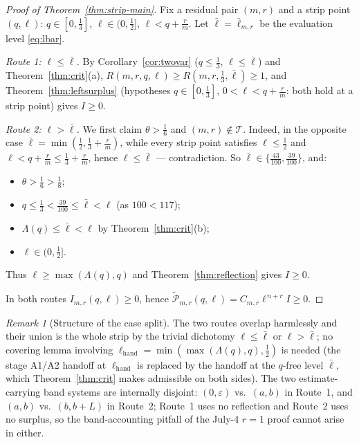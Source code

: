 \documentclass[11pt]{article}
\theoremstyle{remark}
\newtheorem{remark}[theorem]{Remark}
\theoremstyle{plain}
\theoremstyle{plain}
\newcommand{\wtP}{\widetilde{\mathcal P}}
\newcommand{\lbar}{\bar\ell}
\begin{document}
\begin{proof}[Proof of Theorem~\ref{thm:strip-main}]
Fix a residual pair $(m,r)$ and a strip point $(q,\ell)$: $q\in[0,\tfrac13]$, $\ell\in(0,\tfrac12]$, $\ell<q+\tfrac rm$.  Let $\lbar=\lbar_{m,r}$ be the evaluation level \eqref{eq:lbar}.

\emph{Route 1: $\ell\le\lbar$.}  By Corollary~\ref{cor:twovar} ($q\le\tfrac13$, $\ell\le\lbar$) and Theorem~\ref{thm:crit}(a),
$R(m,r,q,\ell)\ge R(m,r,\tfrac13,\lbar)\ge1$,
and Theorem~\ref{thm:leftsurplus} (hypotheses $q\in[0,\tfrac13]$, $0<\ell<q+\tfrac rm$: both hold at a strip point) gives $I\ge0$.

\emph{Route 2: $\ell>\lbar$.}  We first claim $\theta>\tfrac16$ and $(m,r)\notin\mathcal T$.  Indeed, in the opposite case $\lbar=\min(\tfrac12,\tfrac13+\tfrac rm)$, while every strip point satisfies $\ell\le\tfrac12$ and $\ell<q+\tfrac rm\le\tfrac13+\tfrac rm$, hence $\ell\le\lbar$ --- contradiction.  So $\lbar\in\{\tfrac{43}{100},\tfrac{39}{100}\}$, and:
\begin{itemize}
\item $\theta>\tfrac16>\tfrac18$;
\item $q\le\tfrac13<\tfrac{39}{100}\le\lbar<\ell$ (as $100<117$);
\item $\Lambda(q)\le\lbar<\ell$ by Theorem~\ref{thm:crit}(b);
\item $\ell\in(0,\tfrac12]$.
\end{itemize}
Thus $\ell\ge\max(\Lambda(q),q)$ and Theorem~\ref{thm:reflection} gives $I\ge0$.

In both routes $I_{m,r}(q,\ell)\ge0$, hence $\wtP_{m,r}(q,\ell)=C_{m,r}\ell^{\,n+r}I\ge0$.
\end{proof}

\begin{remark}[Structure of the case split]\label{rmk:structure}
The two routes overlap harmlessly and their union is the whole strip by the trivial dichotomy $\ell\le\lbar$ or $\ell>\lbar$; no covering lemma involving $\ell_{\mathrm{hand}}=\min(\max(\Lambda(q),q),\tfrac12)$ is needed (the stage A1/A2 handoff at $\ell_{\mathrm{hand}}$ is replaced by the handoff at the $q$-free level $\lbar$, which Theorem~\ref{thm:crit} makes admissible on both sides).  The two estimate-carrying band systems are internally disjoint: $(0,\varepsilon)$ vs.\ $(a,b)$ in Route~1, and $(a,b)$ vs.\ $(b,b+L)$ in Route~2; Route~1 uses no reflection and Route~2 uses no surplus, so the band-accounting pitfall of the July-4 $r=1$ proof cannot arise in either.
\end{remark}
\end{document}

